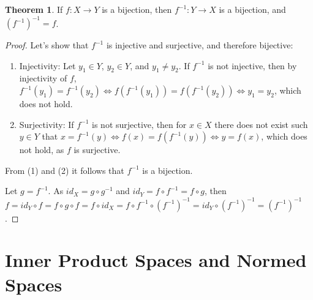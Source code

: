 \documentclass[12pt,a4paper]{article}
\theoremstyle{definition}
\newtheorem{thm}{Theorem}[section]
\begin{document}
\begin{thm}
If $f: X \rightarrow Y$ is a bijection, then $f^{-1}: Y \rightarrow X$ is a
bijection, and $(f^{-1})^{-1} = f$.
\begin{proof}
Let's show that $f^{-1}$ is injective and surjective, and therefore bijective:
\begin{enumerate}
\item Injectivity: Let $y_1 \in Y$, $y_2 \in Y$, and $y_1 \neq y_2$. If
$f^{-1}$ is not injective, then by injectivity of $f$, $f^{-1}(y_1) =
f^{-1}(y_2) \Leftrightarrow f(f^{-1}(y_1)) = f(f^{-1}(y_2)) \Leftrightarrow y_1
= y_2$, which does not hold.
\item Surjectivity: If $f^{-1}$ is not surjective, then for $x \in X$ there
does not exist such $y \in Y$ that $x = f^{-1}(y) \Leftrightarrow f(x) =
f(f^{-1}(y)) \Leftrightarrow y = f(x)$, which does not hold, as $f$ is
surjective.
\end{enumerate}
From (1) and (2) it follows that $f^{-1}$ is a bijection. 

Let $g = f^{-1}$. As $id_X = g \circ g^{-1}$ and $id_Y = f \circ f^{-1} = f
\circ g$, then $f = id_Y \circ f = f \circ g \circ f = f \circ id_X = f \circ
f^{-1} \circ (f^{-1})^{-1} = id_Y \circ (f^{-1})^{-1} = (f^{-1})^{-1}$.
\end{proof}
\end{thm}
\section{Inner Product Spaces and Normed Spaces}
\end{document}

